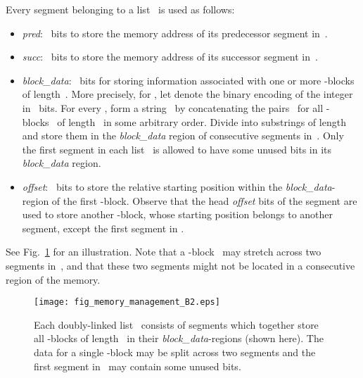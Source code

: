 \documentclass{llncs}
\begin{document}
Every segment belonging to a list~ is used as follows:
\begin{itemize}
\item[{\raise0.3pt\hbox{}}]
  \emph{pred}:
  ~bits to store the memory address of its predecessor segment in~.
\item[{\raise0.3pt\hbox{}}]
  \emph{succ}:
  ~bits to store the memory address of its successor segment in~.
\item[{\raise0.3pt\hbox{}}]
  \emph{block\_data}:
  ~bits for storing information associated with one or more -blocks
  of length~.
  More precisely, for , let  denote the binary
  encoding of the integer~ in ~bits.
  For every , form a string~ by
  concatenating the pairs~ for all -blocks~ of
  length~ in some arbitrary order.
  Divide  into substrings of length~ and store them in the
  \emph{block\_data} region of consecutive segments in~.
  Only the first segment in each list~ is allowed to have some unused
  bits in its \emph{block\_data} region.
\item[{\raise0.3pt\hbox{}}]
  \emph{offset}:
  ~bits to store the relative starting position within
  the \emph{block\_data}-region of the first -block.
  Observe that the head \emph{offset} bits of the segment are used
  to store another -block, whose starting position belongs to another
  segment, except the first segment in .
\end{itemize}

See Fig.~\ref{figure2: fig_memory_management_B} for an illustration.
Note that a -block~ may stretch across two segments
in~, and that these two segments might not be located in
a consecutive region of the memory.

\begin{figure}[h!]
\begin{center}
  \texttt{[image: fig\_memory\_management\_B2.eps]}
\caption{Each doubly-linked list~ consists of segments which together
store all -blocks of length~ in their \emph{block\_data}-regions
(shown here).
The data for a single -block may be split across two segments
and the first segment in~ may contain some unused bits.}
\label{figure2: fig_memory_management_B}
\vspace*{-5mm}
\end{center}
\end{figure}
\end{document}
